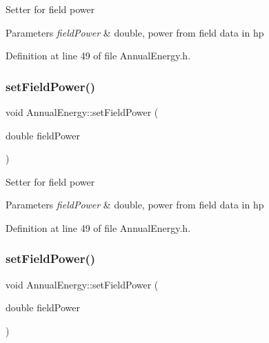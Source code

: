Setter for field power 
\begin{DoxyParams}{Parameters}
{\em field\+Power} & double, power from field data in hp \\
\hline
\end{DoxyParams}


Definition at line 49 of file Annual\+Energy.\+h.

\mbox{\label{class_annual_energy_a4f7212fcf2f6fcd2b12f36ca26a368a1}} 
\subsubsection{\texorpdfstring{set\+Field\+Power()}{setFieldPower()}\hspace{0.1cm}{\footnotesize\ttfamily [2/3]}}
{\footnotesize\ttfamily void Annual\+Energy\+::set\+Field\+Power (\begin{DoxyParamCaption}\item[{double}]{field\+Power }\end{DoxyParamCaption})\hspace{0.3cm}{\ttfamily [inline]}}

Setter for field power 
\begin{DoxyParams}{Parameters}
{\em field\+Power} & double, power from field data in hp \\
\hline
\end{DoxyParams}


Definition at line 49 of file Annual\+Energy.\+h.

\mbox{\label{class_annual_energy_a4f7212fcf2f6fcd2b12f36ca26a368a1}} 
\subsubsection{\texorpdfstring{set\+Field\+Power()}{setFieldPower()}\hspace{0.1cm}{\footnotesize\ttfamily [3/3]}}
{\footnotesize\ttfamily void Annual\+Energy\+::set\+Field\+Power (\begin{DoxyParamCaption}\item[{double}]{field\+Power }\end{DoxyParamCaption})\hspace{0.3cm}{\ttfamily [inline]}}

